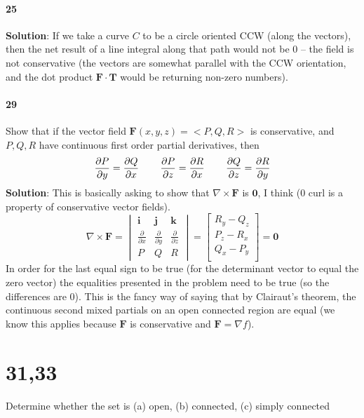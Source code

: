 \documentclass{article}
\newcommand{\parf}[2]{\frac{\partial #1}{\partial #2}}
\begin{document}
    \paragraph{25} \textbf{Solution}: If we take a curve $C$ to be a circle oriented CCW (along the vectors), then the net
    result of a line integral along that path would not be 0 -- the field is not conservative (the vectors are somewhat parallel with the
    CCW orientation, and the dot product $\mathbf{F \cdot T}$ would be returning non-zero numbers).
    
    \paragraph{29} Show that if the vector field $\mathbf{F}(x,y,z)=<P,Q,R>$ is conservative, and $P,Q,R$ have continuous first order partial
    derivatives, then
    \[
        \parf{P}{y} = \parf{Q}{x} \hspace{0.3in}
        \parf{P}{z} = \parf{R}{x} \hspace{0.3in}
        \parf{Q}{z} = \parf{R}{y}
    \]
    \textbf{Solution}: This is basically asking to show that $\nabla \times \mathbf{F}$ is $\mathbf{0}$, I think (0 curl
    is a property of conservative vector fields).
    \[
        \nabla \times \mathbf{F} =
        \begin{vmatrix}
            \mathbf{i} & \mathbf{j} & \mathbf{k}\\
            \parf{}{x} & \parf{}{y} & \parf{}{z} \\
            P & Q & R
        \end{vmatrix} =
        \begin{bmatrix}
            R_y - Q_z \\ P_z - R_x \\ Q_x - P_y \\
        \end{bmatrix}
        = \mathbf{0}
    \]
    In order for the last equal sign to be true (for the determinant vector to equal the zero vector) the equalities presented
    in the problem need to be true (so the differences are 0).
    This is the fancy way of saying that by Clairaut's theorem, the continuous second mixed partials on an open connected region
    are equal (we know this applies because $\mathbf{F}$ is conservative and $\mathbf{F} = \nabla f$).


    \section*{31,33} Determine whether the set is (a) open, (b) connected, (c) simply connected
\end{document}

